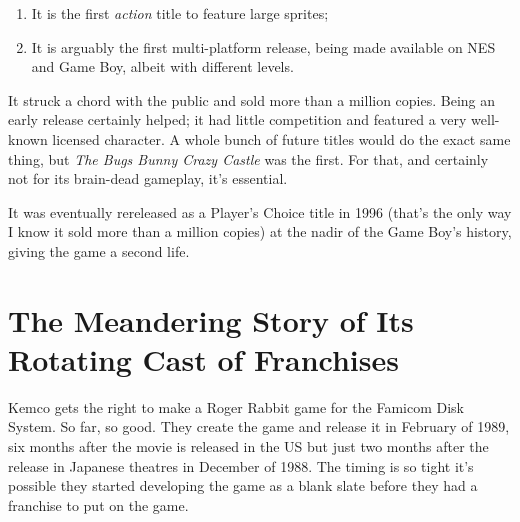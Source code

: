 \documentclass{book}
\begin{document}
\begin{enumerate}
\item It is the first \emph{action} title to feature large sprites;
\item It is arguably the first multi-platform release, being made available on NES and Game Boy, albeit with different levels.
\end{enumerate}\noindent

It struck a chord with the public and sold more than a million copies. Being an early release certainly helped; it had little competition and featured a very well-known licensed character. A whole bunch of future titles would do the exact same thing, but \emph{The Bugs Bunny Crazy Castle} was the first. For that, and certainly not for its brain-dead gameplay, it’s essential.

It was eventually rereleased as a Player’s Choice title in 1996 (that’s the only way I know it sold more than a million copies) at the nadir of the Game Boy’s history, giving the game a second life.

\FloatBarrier\needspace{10mm}\section*{The Meandering Story of Its Rotating Cast of Franchises}\nopagebreak[4]

Kemco gets the right to make a Roger Rabbit game for the Famicom Disk System. So far, so good. They create the game and release it in February of 1989, six months after the movie is released in the US but just two months after the release in Japanese theatres in December of 1988. The timing is so tight it’s possible they started developing the game as a blank slate before they had a franchise to put on the game.
\end{document}
